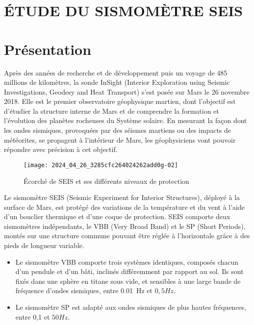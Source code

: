

\section*{ÉTUDE DU SISMOMÈTRE SEIS}
\section{Présentation}
Après des années de recherche et de développement puis un voyage de 485 millions de kilomètres, la sonde InSight (Interior Exploration using Seismic Investigations, Geodesy and Heat Transport) s'est posée sur Mars le 26 novembre 2018. Elle est le premier observatoire géophysique martien, dont l'objectif est d'étudier la structure interne de Mars et de comprendre la formation et l'évolution des planètes rocheuses du Système solaire. En mesurant la façon dont les ondes sismiques, provoquées par des séismes martiens ou des impacts de météorites, se propagent à l'intérieur de Mars, les géophysiciens vont pouvoir répondre avec précision à cet objectif.


\begin{figure}[!h]
\centering
\texttt{[image: 2024\_04\_26\_3285cfc264024262add0g-02]}
\caption{\label{ccmp2023_fig_01}Écorché de SEIS et ses différents niveaux de protection}
\end{figure}




Le sismomètre SEIS (Seismic Experiment for Interior Structures), déployé à la surface de Mars, est protégé des variations de la température et du vent à l'aide d'un bouclier thermique et d'une coque de protection. SEIS comporte deux sismomètres indépendants, le VBB (Very Broad Band) et le SP (Short Periods), montés sur une structure commune pouvant être réglée à l'horizontale grâce à des pieds de longueur variable.

\begin{itemize}
  \item Le sismomètre VBB comporte trois systèmes identiques, composés chacun d'un pendule et d'un bâti, inclinés différemment par rapport au sol. Ils sont fixés dans une sphère en titane sous vide, et sensibles à une large bande de fréquence d'ondes sismiques, entre \SI{0,01}{Hz} et $0,5 \si{Hz}$.
  \item Le sismomètre SP est adapté aux ondes sismiques de plus hautes fréquences, entre 0,1 et $50 \si{Hz}$.
\end{itemize}

